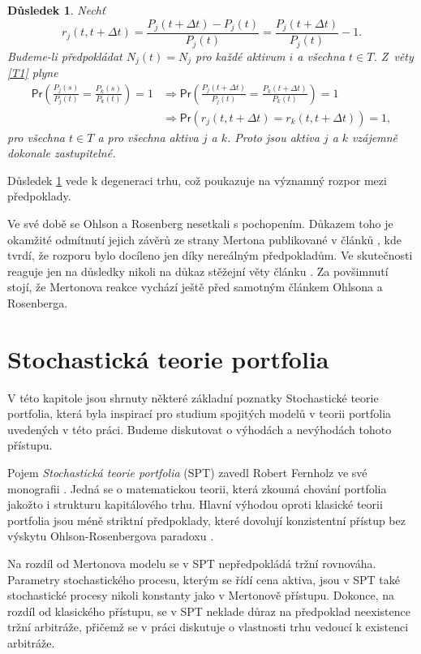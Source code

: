 \documentclass[a4paper,12pt]{report}
\newtheorem{dusledek}[veta]{Důsledek}
\theoremstyle{definition} \newtheorem{definice}[veta]{Definice}
\theoremstyle{remark}
\begin{document}
\begin{dusledek}\label{OR_dusledek}
Nechť 
$$r_j(t,t+\Delta t)=\frac{P_j(t+\Delta t)-P_j(t)}{P_j(t)}=\frac{P_j(t+\Delta t)}{P_j(t)}-1.$$
Budeme-li předpokládat $N_j(t)=N_j$ pro každé aktivum $i$ a všechna $t\in T$. 
Z~věty \ref{T1} plyne
\begin{align*}
\mathsf{Pr}\left(\frac{P_j(s)}{P_j(t)}=\frac{P_k(s)}{P_k(t)}\right)=1&\Longrightarrow\mathsf{Pr}\left(\frac{P_j(t+\Delta t)}{P_j(t)}=\frac{P_k(t+\Delta t)}{P_k(t)}\right)=1 \\
&\Longrightarrow\mathsf{Pr}\left(r_j(t,t+\Delta t)=r_k(t,t+\Delta t)\right)=1,
\end{align*}
pro všechna $t\in T$ a pro všechna aktiva $j$ a $k$.
Proto jsou aktiva $j$ a $k$ vzájemně dokonale zastupitelné.
\end{dusledek}
Důsledek \ref{OR_dusledek} vede k degeneraci trhu, což poukazuje na významný rozpor mezi předpoklady.

Ve své době se Ohlson a Rosenberg nesetkali s pochopením.
Důkazem toho je okamžité odmítnutí jejich závěrů ze strany Mertona publikované v článků \cite{merton1975}, kde tvrdí, že rozporu bylo docíleno jen díky nereálným předpokladům. 
Ve skutečnosti reaguje jen na důsledky nikoli na důkaz stěžejní věty článku \cite{ohlson}.  
Za povšimnutí stojí, že Mertonova reakce vychází ještě před samotným článkem Ohlsona a Rosenberga.


\section{Stochastická teorie portfolia}
V této kapitole jsou shrnuty některé základní poznatky Stochastické teorie portfolia, která byla inspirací pro studium spojitých modelů v teorii portfolia uvedených v této práci.
Budeme diskutovat o výhodách a nevýhodách tohoto přístupu.

Pojem \textit{Stochastická teorie portfolia} (SPT) zavedl Robert Fernholz ve své monografii \cite{fern}.
Jedná se o matematickou teorii, která zkoumá chování portfolia jakožto i strukturu kapitálového trhu.
Hlavní výhodou oproti klasické teorii portfolia jsou méně  striktní předpoklady, které dovolují konzistentní přístup bez výskytu Ohlson-Rosenbergova paradoxu \cite{ohlson}.

Na rozdíl od Mertonova modelu se v SPT nepředpokládá tržní rovnováha.
Parametry stochastického procesu, kterým se řídí cena aktiva, jsou v SPT také stochastické procesy nikoli konstanty jako v Mertonově přístupu.
Dokonce, na rozdíl od klasického přístupu, se v SPT neklade důraz na předpoklad neexistence tržní arbitráže, přičemž se v práci diskutuje o vlastnosti trhu vedoucí k existenci arbitráže. 
\end{document}
